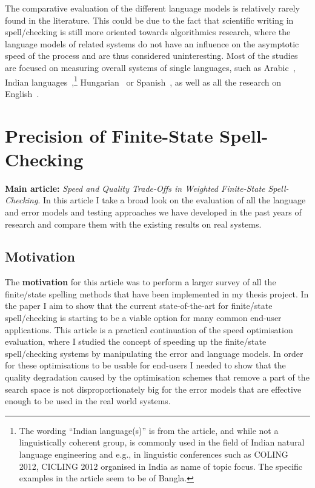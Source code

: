 \documentclass[officiallayout,final]{unihelcompling}
\begin{document}
The comparative evaluation of the different language models is relatively
rarely found in the literature. This could be due to the fact that scientific
writing in spell\-/checking is still more oriented towards algorithmics
research, where the language models of related systems do not have an influence
on the asymptotic speed of the process and are thus considered uninteresting.
Most of the studies are focused on measuring overall systems of single
languages, such as Arabic~\citep{attia2013improved}, Indian
languages~\citep{chaudhuri2002towards},\footnote{The wording ``Indian
    language(s)'' is from the article, and while not a linguistically coherent
    group, is commonly used in the field of Indian natural language engineering
and e.g., in linguistic conferences such as COLING 2012, CICLING 2012 organised
in India as name of topic focus. The specific examples in the article seem to
be of Bangla.} Hungarian~\citep{tron2005hunmorph} or
Spanish~\cite{otero2007contextual}, as well as all the research on
English~\citep{mitton1987spelling}.

\section{Precision of Finite-State Spell-Checking}
\label{sec:quality}

\textbf{Main article:} \emph{Speed and Quality Trade-Offs in Weighted
Finite-State Spell-Checking}. In this article I take a broad look on the
evaluation of all the language and error models and testing approaches we have
developed in the past years of research and compare them with the existing
results on real systems.

\subsection{Motivation}

The \textbf{motivation} for this article was to perform a larger survey of all
the finite\-/state spelling methods that have been implemented in my thesis
project. In the paper I aim to show that the current state-of-the-art for
finite\-/state spell\-/checking is starting to be a viable option for many
common end-user applications. This article is a practical continuation of the
speed optimisation evaluation, where I studied the concept of speeding up the
finite\-/state spell\-/checking systems by manipulating the error and language
models. In order for these optimisations to be usable for end-users I needed to
show that the quality degradation caused by the optimisation schemes that
remove a part of the search space is not disproportionately big for the error
models that are effective enough to be used in the real world systems.
\end{document}
